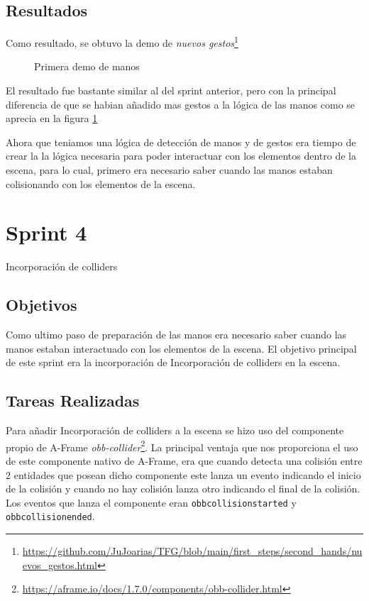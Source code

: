 \documentclass[a4paper, 12pt]{book}
\begin{document}
\subsection{Resultados}
\label{subsec:resultados3}
Como resultado, se obtuvo la demo de \textit{nuevos gestos}\footnote{\url{https://github.com/JuJoarias/TFG/blob/main/first_steps/second_hands/nuevos_gestos.html}}

\begin{figure}[H] 
  \centering
  \fbox{\rule{0pt}{150pt} \rule{0.7\textwidth}{0pt}} 
  \caption{Primera demo de manos}
  \label{fig:sprint3}
\end{figure}

El resultado fue bastante similar al del sprint anterior, pero con la principal diferencia de que se habian añadido mas gestos a la lógica de las manos como se aprecia en la figura \ref{fig:sprint3}

Ahora que teniamos una lógica de detección de manos y de gestos era tiempo de crear la la lógica necesaria para poder interactuar con los elementos dentro de la escena, para lo cual, primero era necesario saber cuando las manos estaban colisionando con los elementos de la escena. 
\section{Sprint 4}
\label{sec:sprint4}
Incorporación de colliders  

\subsection{Objetivos}
\label{subsec:objetivo-principal4}
Como ultimo paso de preparación de las manos era necesario saber cuando las manos estaban interactuado con los elementos de la escena. El objetivo principal de este sprint era la incorporación de Incorporación de colliders  
en la escena. 


\subsection{Tareas Realizadas}
\label{subsec:implementacion4}
Para añadir Incorporación de colliders  
a la escena se hizo uso del componente propio de A-Frame \textit{obb-collider}\footnote{\url{https://aframe.io/docs/1.7.0/components/obb-collider.html}}.
La principal ventaja que nos proporciona el uso de este componente nativo de A-Frame, era que cuando detecta una colisión entre 2 entidades que posean dicho componente este lanza un evento indicando el inicio de la colisión y cuando no hay colisión lanza otro indicando el final de la colisión.
Los eventos que lanza el componente eran \texttt{obbcollisionstarted} y \texttt{obbcollisionended}.
\end{document}

